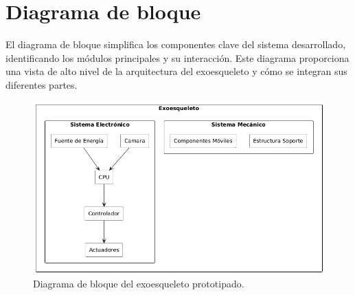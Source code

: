 \section{Diagrama de bloque}
El diagrama de bloque simplifica los componentes clave del sistema desarrollado, identificando los módulos principales y su interacción. Este diagrama proporciona una vista de alto nivel de la arquitectura del exoesqueleto y cómo se integran sus diferentes partes.
\begin{figure}[H]
    \centering
    \includegraphics[width=1\textwidth]{img/DiagramaBloque.png}
    \caption{Diagrama de bloque del exoesqueleto prototipado.}
    \label{fig:flowchart}
\end{figure}